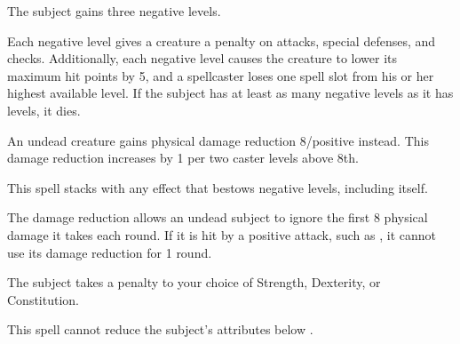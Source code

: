 \spelldur{\durshort}
\begin{spelleffect}
    The subject gains three negative levels.
    \par Each negative level gives a creature a  penalty on attacks, special defenses, and checks. Additionally, each negative level causes the creature to lower its maximum hit points by 5, and a spellcaster loses one spell slot from his or her highest available level. If the subject has at least as many negative levels as it has levels, it dies.
    \par An undead creature gains physical damage reduction 8/positive instead. This damage reduction increases by 1 per two caster levels above 8th.
\end{spelleffect}
\begin{spellnotes}
    This spell stacks with any effect that bestows negative levels, including itself.

    The damage reduction allows an undead subject to ignore the first 8 physical damage it takes each round. If it is hit by a positive attack, such as , it cannot use its damage reduction for 1 round.
\end{spellnotes}

\spelldur{\durshort}
\begin{spelleffect}
    The subject takes a  penalty to your choice of Strength, Dexterity, or Constitution.
\end{spelleffect}
\begin{spellnotes}
    This spell cannot reduce the subject's attributes below .
\end{spellnotes}

